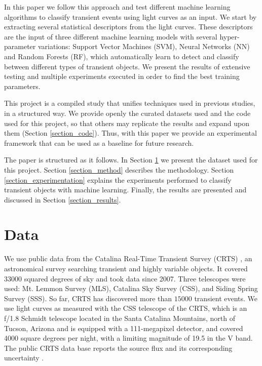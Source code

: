 \documentclass[a4paper,fleqn,usenatbib]{mnras}
\begin{document}
In this paper we follow this approach and test different machine
learning algorithms to classify transient events using light curves as
an input.  
We start by extracting several statistical descriptors from the light
curves.
These descriptors are the input of three different machine learning
models with several hyper-parameter variations: Support Vector
Machines (SVM), Neural Networks (NN) and Random Forests (RF), which automatically
learn to detect and classify between different types of transient
objects. 
We present the results of extensive testing and multiple experiments 
executed in order to find the best training parameters. 

This project is a compiled study that unifies techniques used in previous studies, in a structured way. We provide openly the curated datasets used and the code used for this project, so that others may replicate the results and expand upon them (Section \ref{section_code}). Thus, with this paper we provide an experimental framework that can be used as a baseline for future research.


The paper is structured as it follows. In Section \ref{section_data}
we present the dataset used for this project. 
Section \ref{section_method} describes the methodology.
Section \ref{section_experimentation} explains the experiments
performed to classify transient objects with machine
learning. 
Finally, the results are presented and discussed in
Section \ref{section_results}.  

\section{Data} \label{section_data}

We use public data from the Catalina Real-Time Transient Survey
(CRTS) \citep{1111.2566}, an astronomical survey searching transient
and highly variable objects.   
It covered 33000 squared degrees of sky and took data since 2007.
Three telescopes were used: Mt. Lemmon Survey (MLS), Catalina Sky
Survey (CSS), and Siding Spring Survey (SSS). So far, CRTS has
discovered more than $15000$ transient events.
We use light curves as measured with the CSS telescope of the CRTS, which is
an f/1.8 Schmidt telescope located in the Santa Catalina Mountains, north of Tucson,
Arizona and is equipped with a 111-megapixel  detector, and covered
4000 square degrees per night, with a limiting magnitude of 19.5 in
the V band.  
The public CRTS data base reports the source flux and its
corresponding uncertainty \citep{1996PASP..108..851S}.
\end{document}
